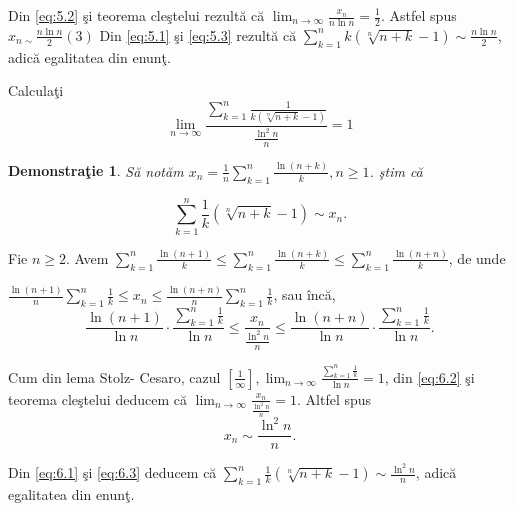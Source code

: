 \documentclass[a4paper,12pt,oneside]{report}
\newtheorem{demonstration}{Demonstra\c tie}
\begin{document}
Din \ref{eq:5.2} \c si teorema cle\c stelui rezult\u a c\u a \(\lim_{n \to \infty }\frac{x_{n}}{n\ln n } = \frac{1}{2}\). Astfel spus \(x_{n\sim }\frac{n\ln n }{2} (3)\)
Din \ref{eq:5.1} \c si \ref{eq:5.3} rezult\u a c\u a \(\sum_{k=1}^{n}k\left ( \sqrt[n]{n+k}-1 \right )\sim \frac{n\ln n }{2}\), adic\u a egalitatea din enun\c t. 


Calcula\c ti 
\begin{displaymath}
  \lim_{n \to \infty }\frac{\sum_{k=1}^{n}\frac{1}{k\left ( \sqrt[n]{n+k}-1 \right )}}{\frac{\ln^{2}n}{n}} = 1
\end{displaymath}

\begin{demonstration}
  S\u a not\u am \(x_{n}= \frac{1}{n}\sum_{k=1}^{n}\frac{\ln\left ( n+k \right )}{k}, n\geq 1\). 
\c stim c\u a 

\end{demonstration}
\begin{displaymath}
  \sum_{k=1}^{n}\frac{1}{k}\left ( \sqrt[n]{n+k}-1 \right )\sim x_{n}. \label{eq:6.1} \tag{6.1}
\end{displaymath}

Fie \(n\geq 2\). Avem \(\sum_{k=1}^{n}\frac{\ln\left ( n+1 \right )}{k}\leq \sum_{k=1}^{n}\frac{\ln\left ( n+k \right )}{k}\leq \sum_{k=1}^{n}\frac{\ln\left ( n+n \right )}{k}\), de unde 

\(\frac{\ln \left ( n+1 \right )}{n}\sum_{k=1}^{n}\frac{1}{k}\leq x_{n}\leq \frac{\ln \left ( n+n \right )}{n}\sum_{k=1}^{n}\frac{1}{k}\), sau \^ inc\u a, 
\begin{displaymath}
  \frac{\ln \left ( n+1 \right )}{\ln n}\cdot \frac{\sum_{k=1}^{n}\frac{1}{k}}{\ln n}\leq \frac{x_{n}}{\frac{\ln^{2}n}{n}}\leq \frac{\ln \left ( n+n \right )}{\ln n}\cdot \frac{\sum_{k=1}^{n}\frac{1}{k}}{\ln n }. \label{eq:6.2} \tag{6.2}
\end{displaymath}

Cum din lema Stolz- Cesaro, cazul \(\left [ \frac{1}{\infty } \right ], \lim_{n \to \infty }\frac{\sum_{k=1}^{n}\frac{1}{k}}{\ln n} = 1\), din \ref{eq:6.2} \c si teorema cle\c stelui deducem c\u a \(\lim_{n \to \infty }\frac{x_{n}}{\frac{\ln ^{2}n}{n}} = 1\). 
Altfel spus 
\begin{displaymath}
  x_{n}\sim \frac{\ln^{2}n}{n}. \label{eq:6.3} \tag{6.3}
\end{displaymath}


Din \ref{eq:6.1} \c si \ref{eq:6.3} deducem c\u a \(\sum_{k=1}^{n}\frac{1}{k}\left ( \sqrt[n]{n+k}-1 \right )\sim \frac{\ln^{2}n}{n}\), adic\u a egalitatea din enun\c t. 
\end{document}
